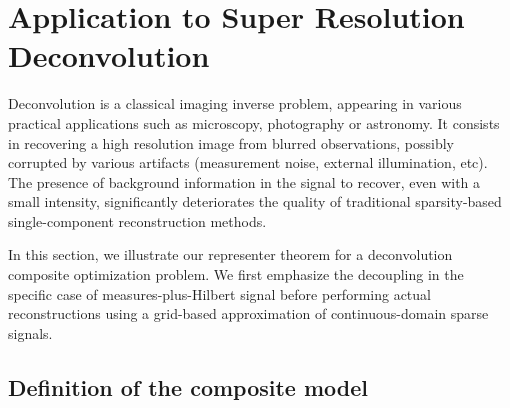 
\section{Application to Super Resolution Deconvolution}
\label{sec:application}

    Deconvolution is a classical imaging inverse problem, appearing in various practical applications such as microscopy, photography or astronomy. It consists in recovering a high resolution image from blurred observations, possibly corrupted by various artifacts (measurement noise, external illumination, etc).
    The presence of background information in the signal to recover, even with a small intensity, significantly deteriorates the quality of traditional sparsity-based single-component reconstruction methods.

    In this section, we illustrate our representer theorem for a deconvolution composite optimization problem. We first emphasize the decoupling in the specific case of measures-plus-Hilbert signal before performing actual reconstructions using a grid-based approximation of continuous-domain sparse signals.


    \subsection{Definition of the composite model}
    \label{sec:comp:model}

